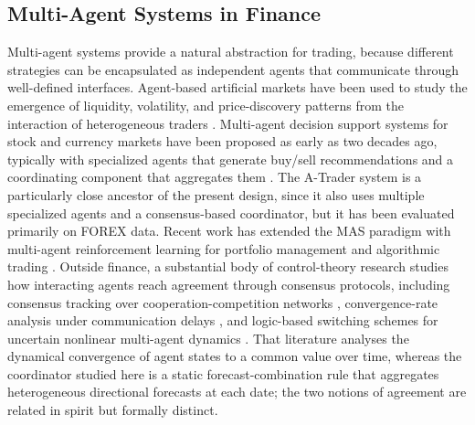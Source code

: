 \documentclass{ieeeaccess}
\begin{document}
\subsection{Multi-Agent Systems in Finance}

Multi-agent systems provide a natural abstraction for trading, because different strategies can be encapsulated as independent agents that communicate through well-defined interfaces. Agent-based artificial markets have been used to study the emergence of liquidity, volatility, and price-discovery patterns from the interaction of heterogeneous traders \cite{lebaron2011,8675280}. Multi-agent decision support systems for stock and currency markets have been proposed as early as two decades ago, typically with specialized agents that generate buy/sell recommendations and a coordinating component that aggregates them \cite{luo2002,korczak2013,hernes2016,hernes2024}. The A-Trader system \cite{korczak2013,hernes2016} is a particularly close ancestor of the present design, since it also uses multiple specialized agents and a consensus-based coordinator, but it has been evaluated primarily on FOREX data. Recent work has extended the MAS paradigm with multi-agent reinforcement learning for portfolio management \cite{huang2022} and algorithmic trading \cite{shavandi2022}. Outside finance, a substantial body of control-theory research studies how interacting agents reach agreement through consensus protocols, including consensus tracking over cooperation-competition networks \cite{li2025consensus}, convergence-rate analysis under communication delays \cite{shi2025consensus}, and logic-based switching schemes for uncertain nonlinear multi-agent dynamics \cite{fan2025}. That literature analyses the dynamical convergence of agent states to a common value over time, whereas the coordinator studied here is a static forecast-combination rule that aggregates heterogeneous directional forecasts at each date; the two notions of agreement are related in spirit but formally distinct.
\end{document}

